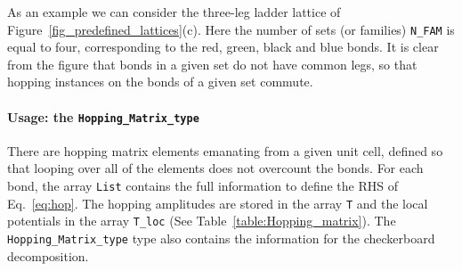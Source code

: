 As an  example we can consider the three-leg ladder lattice of Figure~\ref{fig_predefined_lattices}(c).   Here the number of sets (or families) \texttt{N\_FAM} is equal to four, corresponding to the red, green, black and blue  bonds. It is clear from the figure that bonds in a given set do not have common legs, so that hopping instances on the bonds of a given set commute.

\paragraph*{Usage: the \texttt{Hopping\_Matrix\_type} } %

There are  hopping matrix elements emanating from a given unit cell, defined so that looping over all of the elements does not overcount the bonds. For each bond, the array 
\texttt{List}   contains the full  information to define the  RHS of Eq.~\eqref{eq:hop}.    The hopping amplitudes are  stored in the  array  \texttt{T}  and the local potentials in the  array \texttt{T\_loc}   (See  Table~\ref{table:Hopping_matrix}).    The  \texttt{Hopping\_Matrix\_type}   type    also contains the information for the  checkerboard   decomposition.

